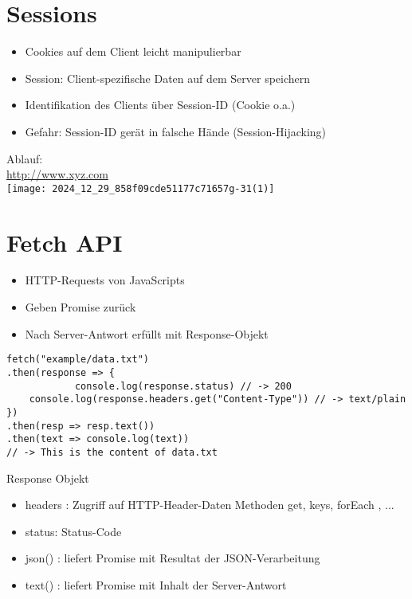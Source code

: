 \section*{Sessions}
\begin{itemize}
  \item Cookies auf dem Client leicht manipulierbar
  \item Session: Client-spezifische Daten auf dem Server speichern
  \item Identifikation des Clients über Session-ID (Cookie o.a.)
  \item Gefahr: Session-ID gerät in falsche Hände (Session-Hijacking)
\end{itemize}

Ablauf:\\
\href{http://www.xyz.com}{http://www.xyz.com}\\
\texttt{[image: 2024\_12\_29\_858f09cde51177c71657g-31(1)]}

\section*{Fetch API}
\begin{itemize}
  \item HTTP-Requests von JavaScripts
  \item Geben Promise zurück
  \item Nach Server-Antwort erfüllt mit Response-Objekt
\end{itemize}

\begin{verbatim}
fetch("example/data.txt")
.then(response => {
            console.log(response.status) // -> 200
    console.log(response.headers.get("Content-Type")) // -> text/plain
})
.then(resp => resp.text())
.then(text => console.log(text))
// -> This is the content of data.txt
\end{verbatim}

Response Objekt

\begin{itemize}
  \item headers : Zugriff auf HTTP-Header-Daten Methoden get, keys, forEach , ...
  \item status: Status-Code
  \item json() : liefert Promise mit Resultat der JSON-Verarbeitung
  \item text() : liefert Promise mit Inhalt der Server-Antwort
\end{itemize}